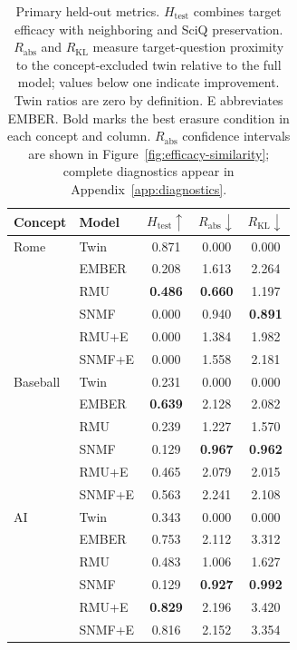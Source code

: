 \begin{table}[t]
  \centering
  \small
  \begin{tabular}{llccc}
    \toprule
    Concept & Model & $H_{\mathrm{test}}\uparrow$
      & $R_{\mathrm{abs}}\downarrow$
      & $R_{\mathrm{KL}}\downarrow$ \\
    \midrule
    Rome & Twin & 0.871 & 0.000 & 0.000 \\
    & EMBER & 0.208 & 1.613 & 2.264 \\
    & RMU & \textbf{0.486} & \textbf{0.660} & 1.197 \\
    & SNMF & 0.000 & 0.940 & \textbf{0.891} \\
    & RMU+E & 0.000 & 1.384 & 1.982 \\
    & SNMF+E & 0.000 & 1.558 & 2.181 \\
    \midrule
    Baseball & Twin & 0.231 & 0.000 & 0.000 \\
    & EMBER & \textbf{0.639} & 2.128 & 2.082 \\
    & RMU & 0.239 & 1.227 & 1.570 \\
    & SNMF & 0.129 & \textbf{0.967} & \textbf{0.962} \\
    & RMU+E & 0.465 & 2.079 & 2.015 \\
    & SNMF+E & 0.563 & 2.241 & 2.108 \\
    \midrule
    AI & Twin & 0.343 & 0.000 & 0.000 \\
    & EMBER & 0.753 & 2.112 & 3.312 \\
    & RMU & 0.483 & 1.006 & 1.627 \\
    & SNMF & 0.129 & \textbf{0.927} & \textbf{0.992} \\
    & RMU+E & \textbf{0.829} & 2.196 & 3.420 \\
    & SNMF+E & 0.816 & 2.152 & 3.354 \\
    \bottomrule
  \end{tabular}
  \caption{Primary held-out metrics. $H_{\mathrm{test}}$ combines target
  efficacy with neighboring and SciQ preservation. $R_{\mathrm{abs}}$ and
  $R_{\mathrm{KL}}$ measure target-question proximity to the concept-excluded
  twin relative to the full model; values below one indicate improvement.
  Twin ratios are zero by definition. E abbreviates EMBER. Bold marks the best
  erasure condition in each concept and column. $R_{\mathrm{abs}}$ confidence
  intervals are shown in Figure~\ref{fig:efficacy-similarity}; complete
  diagnostics appear in Appendix~\ref{app:diagnostics}.}
  \label{tab:target}
\end{table}

